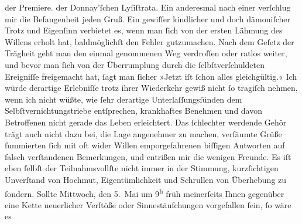 \begin{ledgroupsized}[t]{13cm}
{{{                        der Premiere.}}}\label{K_L01840_1h} der Donnay’ſchen
                    {\pb}Lyſiſtrata. Ein anderesmal nach einer \label{K_L01840_2v}\label{K_L01840_2h} verſchlug mir
                    die Befangenheit jeden Gruß. Ein gewiſſer kindlicher und doch dämoniſcher Trotz
                    und Eigenſinn verbietet es, wenn man ſich von der ersten Lähmung des Willens
                    erholt hat, baldmöglichſt den Fehler gutzumachen. Nach dem Geſetz der Trägheit
                    geht man den einmal genommenen Weg verdroſſen oder ratlos weiter, und bevor man
                    ſich von der Überrumplung durch die ſelbſtverſchuldeten Ereigniſſe freigemacht
                    hat, ſagt man ſicher »Jetzt iſt ſchon alles gleichgültig.« Ich würde derartige
                    Erlebniſſe trotz ihrer Wiederkehr gewiß nicht ſo tragiſch nehmen, wenn ich nicht
                    wüßte, wie ſehr derartige Unterlaſſungsſünden dem Selbſtvernichtungstriebe
                    entſprechen, krankhaftes Benehmen und davon Betroffenen nicht gerade das Leben
                    erleichtert. Das ſchlechter werdende Gehör trägt auch nicht dazu bei, {\pb}die Lage angenehmer zu machen, verſäumte Grüße
                    ſummierten ſich mit oft wider Willen emporgefahrenen biſſigen Antworten auf
                    falsch verſtandenen Bemerkungen, und entrißen mir die wenigen Freunde. Es iſt
                    eben ſelbſt der Teilnahmsvollſte nicht immer in der Stimmung, kurzſichtigen
                    Unverſtand von Hochmut, Eigentümlichkeit und Schrullen von Überhebung zu
                    ſondern. Sollte Mittwoch, den 5. Mai um 9\textsuperscript{h} früh meinerſeits Ihnen gegenüber eine
                    Kette neuerlicher Verſtöße oder Sinnestäuſchungen vorgefallen ſein, ſo wäre es

\end{ledgroupsized}
